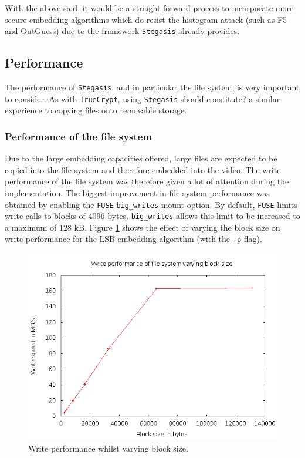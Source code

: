 \documentclass[paper=a4, fontsize=11pt,twoside]{scrartcl}
\numberwithin{table}{section}
\numberwithin{figure}{section}
\numberwithin{algorithm}{section}
\begin{document}
With the above said, it would be a straight forward process to incorporate more secure embedding algorithms which do resist the histogram attack (such as F5 and OutGuess) due to the framework \texttt{Stegasis} already provides.

\subsection{Performance}
\label{perf}

The performance of \texttt{Stegasis}, and in particular the file system, is very important to consider. As with \texttt{TrueCrypt}, using \texttt{Stegasis} should constitute? a similar experience to copying files onto removable storage. 

\subsubsection{Performance of the file system}

Due to the large embedding capacities offered, large files are expected to be copied into the file system and therefore embedded into the video. The write performance of the file system was therefore given a lot of attention during the implementation. The biggest improvement in file system performance was obtained by enabling the \texttt{FUSE} \texttt{big\_writes} mount option. By default, \texttt{FUSE} limits write calls to blocks of 4096 bytes. \texttt{big\_writes} allows this limit to be increased to a maximum of 128 kB. Figure \ref{writeper} shows the effect of varying the block size on write performance for the LSB embedding algorithm (with the \texttt{-p} flag).

\begin{figure}[!tbh]
\centerline{\includegraphics[width=\textwidth]{images/writeper.png}}
\caption{Write performance whilst varying block size.}
\label{writeper}
\end{figure}
\end{document}
